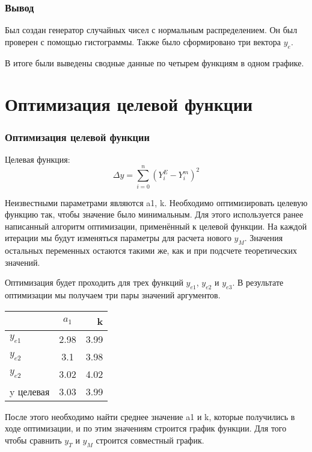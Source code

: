 \documentclass[a4paper, 12pt]{article}
\begin{document}
\section{Вывод}
Был создан генератор случайных чисел с нормальным распределением. Он был проверен с помощью гистограммы. Также было сформировано три вектора $y_e$.

В итоге были выведены сводные данные по четырем функциям в одном графике. 

\newpage
\part{Оптимизация целевой функции}
\setcounter{section}{0}
\section{Оптимизация целевой функции}
Целевая функция:
$$
\Delta y = \sum_{i=0}^n (Y_i^E - Y_i^m)^2
$$

 Неизвестными параметрами являются a1, k. Необходимо оптимизировать целевую функцию так, чтобы значение было минимальным. Для этого используется ранее написанный алгоритм оптимизации, применённый к целевой функции. На каждой итерации мы будут изменяться параметры для расчета нового $y_M$. Значения остальных переменных остаются такими же, как и при подсчете теоретических значений.

Оптимизация будет проходить для трех функций $y_{e1}$, $y_{e2}$ и $y_{e3}$. В результате оптимизации мы получаем три пары значений аргументов.

\begin{center}
  \begin{tabular}{ | l | c | r | }
    \hline
    \text{} & $a_1$ & k \\ \hline
    $y_{e1}$ & 2.98 & 3.99 \\ \hline
    $y_{e2}$ & 3.1 & 3.98 \\ \hline
    $y_{e2}$ & 3.02 & 4.02 \\ \hline
    y целевая & 3.03 & 3.99 \\
    \hline
  \end{tabular}
\end{center}

После этого необходимо найти среднее значение a1 и k, которые получились в ходе оптимизации, и по этим значениям строится график функции. Для того чтобы сравнить $y_T$ и $y_M$ строится совместный график. 

\end{document}
